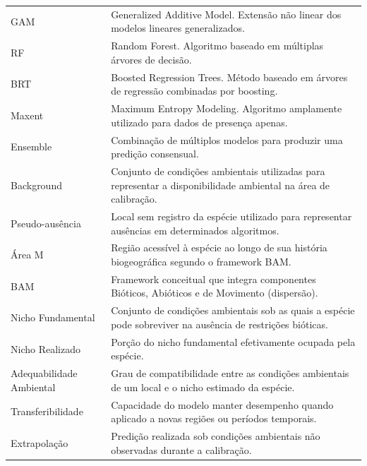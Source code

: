 \begin{longtable}{
		p{}
		p{}
	}
	GAM &
	Generalized Additive Model. Extensão não linear dos modelos lineares generalizados.
	\\
	
	RF &
	Random Forest. Algoritmo baseado em múltiplas árvores de decisão.
	\\
	
	BRT &
	Boosted Regression Trees. Método baseado em árvores de regressão combinadas por boosting.
	\\
	
	Maxent &
	Maximum Entropy Modeling. Algoritmo amplamente utilizado para dados de presença apenas.
	\\
	
	Ensemble &
	Combinação de múltiplos modelos para produzir uma predição consensual.
	\\
	
	Background &
	Conjunto de condições ambientais utilizadas para representar a disponibilidade ambiental na área de calibração.
	\\
	
	Pseudo-ausência &
	Local sem registro da espécie utilizado para representar ausências em determinados algoritmos.
	\\
	
	Área M &
	Região acessível à espécie ao longo de sua história biogeográfica segundo o framework BAM.
	\\
	
	BAM &
	Framework conceitual que integra componentes Bióticos, Abióticos e de Movimento (dispersão).
	\\
	
	Nicho Fundamental &
	Conjunto de condições ambientais sob as quais a espécie pode sobreviver na ausência de restrições bióticas.
	\\
	
	Nicho Realizado &
	Porção do nicho fundamental efetivamente ocupada pela espécie.
	\\
	
	Adequabilidade Ambiental &
	Grau de compatibilidade entre as condições ambientais de um local e o nicho estimado da espécie.
	\\
	
	Transferibilidade &
	Capacidade do modelo manter desempenho quando aplicado a novas regiões ou períodos temporais.
	\\
	
	Extrapolação &
	Predição realizada sob condições ambientais não observadas durante a calibração.
	\\
	

\end{longtable}
